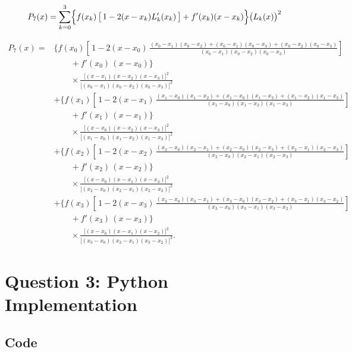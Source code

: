 \documentclass[12pt,a4paper]{article}
\begin{document}
\[
  P_7(x)=\sum_{k=0}^{3}\Bigl\{f(x_k)\,\bigl[\,1-2(x-x_k)L_k'(x_k)\,\bigr]+f'(x_k)(x-x_k)\Bigr\}\bigl(L_k(x)\bigr)^2
\]

{\footnotesize
\begin{align*}
  P_7(x) ={}& \Biggl\{ f(x_0)\left[\, 1 - 2(x-x_0)\,\frac{(x_0-x_1)(x_0-x_2) + (x_0-x_1)(x_0-x_3) + (x_0-x_2)(x_0-x_3)}{(x_0-x_1)(x_0-x_2)(x_0-x_3)} \right] \\
  &\qquad + f'(x_0)\,(x-x_0) \Biggr\} \\
  &\qquad\times \frac{\bigl[(x-x_1)(x-x_2)(x-x_3)\bigr]^2}{\bigl[(x_0-x_1)(x_0-x_2)(x_0-x_3)\bigr]^2} \\[12pt]
  &+ \Biggl\{ f(x_1)\left[\, 1 - 2(x-x_1)\,\frac{(x_1-x_0)(x_1-x_2) + (x_1-x_0)(x_1-x_3) + (x_1-x_2)(x_1-x_3)}{(x_1-x_0)(x_1-x_2)(x_1-x_3)} \right] \\
  &\qquad + f'(x_1)\,(x-x_1) \Biggr\} \\
  &\qquad\times \frac{\bigl[(x-x_0)(x-x_2)(x-x_3)\bigr]^2}{\bigl[(x_1-x_0)(x_1-x_2)(x_1-x_3)\bigr]^2} \\[12pt]
  &+ \Biggl\{ f(x_2)\left[\, 1 - 2(x-x_2)\,\frac{(x_2-x_0)(x_2-x_1) + (x_2-x_0)(x_2-x_3) + (x_2-x_1)(x_2-x_3)}{(x_2-x_0)(x_2-x_1)(x_2-x_3)} \right] \\
  &\qquad + f'(x_2)\,(x-x_2) \Biggr\} \\
  &\qquad\times \frac{\bigl[(x-x_0)(x-x_1)(x-x_3)\bigr]^2}{\bigl[(x_2-x_0)(x_2-x_1)(x_2-x_3)\bigr]^2} \\[12pt]
  &+ \Biggl\{ f(x_3)\left[\, 1 - 2(x-x_3)\,\frac{(x_3-x_0)(x_3-x_1) + (x_3-x_0)(x_3-x_2) + (x_3-x_1)(x_3-x_2)}{(x_3-x_0)(x_3-x_1)(x_3-x_2)} \right] \\
  &\qquad + f'(x_3)\,(x-x_3) \Biggr\} \\
  &\qquad\times \frac{\bigl[(x-x_0)(x-x_1)(x-x_2)\bigr]^2}{\bigl[(x_3-x_0)(x_3-x_1)(x_3-x_2)\bigr]^2}.
\end{align*}
}
\section*{Question 3: Python Implementation}
 
\subsection*{Code}
 
\end{document}
